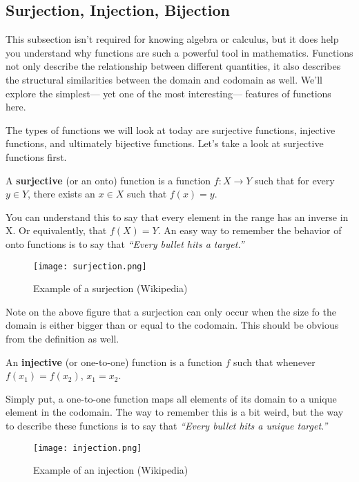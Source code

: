 \subsection{Surjection, Injection, Bijection}

This subsection isn't required for knowing algebra or calculus, but it does help you understand why functions are such a powerful tool in mathematics. Functions not only describe the relationship between different quantities, it also describes the structural similarities between the domain and codomain as well. We'll explore the simplest--- yet one of the most interesting--- features of functions here.

The types of functions we will look at today are surjective functions, injective functions, and ultimately bijective functions. Let's take a look at surjective functions first.

\begin{definition}
    A \textbf{surjective} (or an onto) function is a function $f: X \longrightarrow Y$ such that for every $y \in Y$, there exists an $x \in X$ such that $f(x) = y$.
\end{definition}

You can understand this to say that every element in the range has an inverse in X. Or equivalently, that $f(X) = Y$. An easy way to remember the behavior of onto functions is to say that \textit{``Every bullet hits a target.''} 

\begin{figure}[H]
    \texttt{[image: surjection.png]}
    \centering
    \caption{Example of a surjection (Wikipedia)}
  \end{figure}

Note on the above figure that a surjection can only occur when the size fo the domain is either bigger than or equal to the codomain. This should be obvious from the definition as well.

\begin{definition}
    An \textbf{injective} (or one-to-one) function is a function $f$ such that whenever $f(x_1) = f(x_2)$, $x_1 = x_2$.
\end{definition}

Simply put, a one-to-one function maps all elements of its domain to a unique element in the codomain. The way to remember this is a bit weird, but the way to describe these functions is to say that \textit{``Every bullet hits a unique target.''}

\begin{figure}[H]
    \texttt{[image: injection.png]}
    \centering
    \caption{Example of an injection (Wikipedia)}
  \end{figure}

